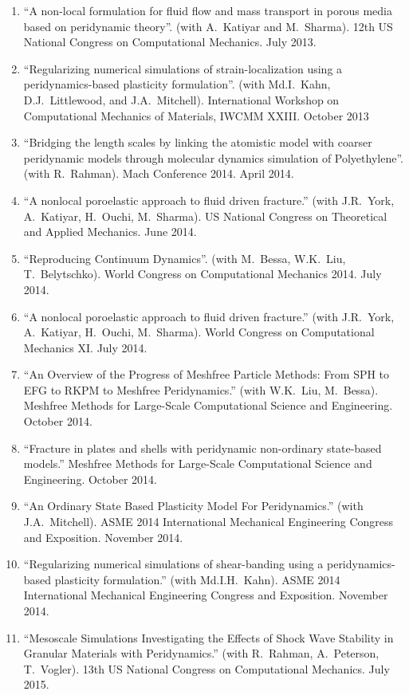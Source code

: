 \begin{enumerate}[resume]
    \item ``A non-local formulation for fluid flow and mass transport in porous media based on peridynamic theory''. (with A.~Katiyar and M.~Sharma). 12th US National Congress on Computational Mechanics. July 2013.
    \item ``Regularizing numerical simulations of strain-localization using a peridynamics-based plasticity formulation''. (with Md.I.~Kahn, D.J.~Littlewood, and J.A.~Mitchell). International Workshop on Computational Mechanics of Materials, IWCMM XXIII. October 2013
    \item ``Bridging the length scales by linking the atomistic model with coarser peridynamic models through molecular dynamics simulation of Polyethylene''. (with R.~Rahman). Mach Conference 2014.  April 2014.
    \item ``A nonlocal poroelastic approach to fluid driven fracture.'' (with J.R.~York, A.~Katiyar, H.~Ouchi, M.~Sharma). US National Congress on Theoretical and Applied Mechanics.  June 2014.
    \item ``Reproducing Continuum Dynamics''. (with M.~Bessa, W.K.~Liu, T.~Belytschko). World Congress on Computational Mechanics 2014.  July 2014.
    \item ``A nonlocal poroelastic approach to fluid driven fracture.'' (with J.R.~York, A.~Katiyar, H.~Ouchi, M.~Sharma). World Congress on Computational Mechanics XI.  July 2014.
    \item ``An Overview of the Progress of Meshfree Particle Methods: From SPH to EFG to RKPM to Meshfree Peridynamics.'' (with W.K.~Liu, M.~Bessa). Meshfree Methods for Large-Scale Computational Science and Engineering. October 2014.
    \item ``Fracture in plates and shells with peridynamic non-ordinary state-based models.''  Meshfree Methods for Large-Scale Computational Science and Engineering. October 2014.
    \item ``An Ordinary State Based Plasticity Model For Peridynamics.'' (with J.A.~Mitchell). ASME 2014 International Mechanical Engineering Congress and Exposition. November 2014.
    \item ``Regularizing numerical simulations of shear-banding using a peridynamics-based plasticity formulation.'' (with Md.I.H.~Kahn). ASME 2014 International Mechanical Engineering Congress and Exposition. November 2014.
    \item ``Mesoscale Simulations Investigating the Effects of Shock Wave Stability in Granular Materials with Peridynamics.'' (with R.~Rahman, A.~Peterson, T.~Vogler). 13th US National Congress on Computational Mechanics. July 2015.

\end{enumerate}
